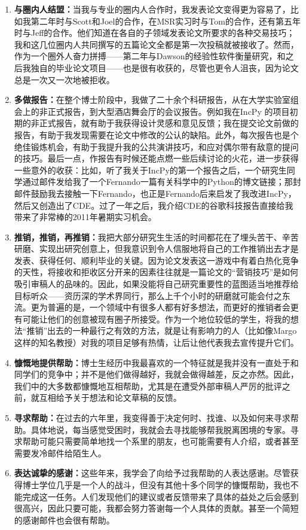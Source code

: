 \documentclass[12pt,UTF8,nofonts]{book}
\begin{document}
\begin{enumerate}
  \item \textbf{与圈内人结盟：}当我与专业的圈内人合作时，我发表论文变得更为容易了，比如我第二年时与Scott和Joel的合作，在MSR实习时与Tom的合作，还有第五年时与Jeff的合作。他们知道在各自的子领域发表论文所要求的各种交易技巧；我和这几位圈内人共同撰写的五篇论文全都是第一次投稿就被接收了。然而，作为一个圈外人奋力拼搏——第二年与Dawson的经验性软件衡量研究，和之后我独自的毕业论文项目——也是很有收获的，尽管也更令人沮丧，因为论文总是一次又一次地被拒收。
  \item \textbf{多做报告：}在整个博士阶段中，我做了二十余个科研报告，从在大学实验室组会上的非正式报告，到大型酒店舞会厅的会议报告。例如我在IncPy 的项目初期的非正式报告，就有助于我获得设计灵感和意见反馈；我在提交论文前做的报告，有助于我发现需要在论文中修改的公认的缺陷。此外，每次报告也是个绝佳锻炼机会，有助于我提升我的公共演讲技巧，和应对偶尔带有敌意的提问的技巧。最后一点，作报告有时候还能点燃一些后续讨论的火花，进一步获得一些意外的收获：比如，听了我关于IncPy的第一个报告之后，一个研究生同学通过邮件发给我了一个Fernando一篇有关科学中的Python的博文链接；那封邮件鼓励我去接触一下Fernando，也正是Fernando后来启发了我改进IncPy，然后又创造出了CDE。过了一年之后，我介绍CDE的谷歌科技报告直接给我带来了非常棒的2011年暑期实习机会。
  \item \textbf{推销，推销，再推销：}我把大部分研究生生活的时间都花在了埋头苦干、辛苦研磨、实现出研究创意上，但我意识到令人信服地将自己的工作推销出去才是发表、获得任何、顺利毕业的关键。因为论文发表这一游戏中有着白热化竞争的天性，将接收和拒收区分开来的因素往往就是一篇论文的“营销技巧”是如何吸引审稿人的品味的。因此，如果没能将自己研究重要性的蓝图适当地推荐给目标听众——资历深的学术界同行，那么上千个小时的研磨就可能会付之东流。更为普遍的是，一个领域中有很多人都有好多想法，而更好的推销者会更有可能让他们的创意被现有圈子所接受。作为一个地位较低的学生，将我的想法“推销”出去的一种最行之有效的方法，就是让有影响力的人（比如像Margo 这样的知名教授）对我的项目足够有热情，让后让他代表我去宣传提升它们。
  \item \textbf{慷慨地提供帮助：}博士生经历中我最喜欢的一个特征就是我并没有一直处于和同学们的竞争中；并不是他们做得越好，我就会做得越差，反之亦然。因此，我们中的大多数都慷慨地互相帮助，尤其是在遭受外部审稿人严厉的批评之前，就互相给予关于想法和论文草稿的反馈。
  \item \textbf{寻求帮助：}在过去的六年里，我变得善于决定何时、找谁、以及如何来寻求帮助。具体地说，每当感觉受困时，我就会去寻找能够帮我脱离困境的专家。寻求帮助可能只需要简单地找一个系里的朋友，也可能需要有人介绍，或者甚至需要发冷邮件给陌生人。
  \item \textbf{表达诚挚的感谢：}这些年来，我学会了向给予过我帮助的人表达感谢。尽管获得博士学位几乎是一个人的战斗，但没有其他十多个同学的慷慨帮助，我也不能完成这一任务。人们发现他们的建议或者反馈带来了具体的益处之后会感到很高兴，因此只要可能，我都会努力答谢每一个人具体的贡献。甚至一个简短的感谢邮件也会很有帮助。

\end{enumerate}
\end{document}
